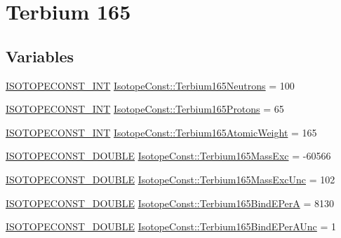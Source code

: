 \hypertarget{group___isotope_const-_terbium-_tb165}{}\section{Terbium 165}
\label{group___isotope_const-_terbium-_tb165}
\subsection*{Variables}
\begin{DoxyCompactItemize}
\item 
\mbox{\hyperlink{group___isotope_const-_macros_ga5f18360b3e99483a35c32d789e62621c}{I\+S\+O\+T\+O\+P\+E\+C\+O\+N\+S\+T\+\_\+\+I\+NT}} \mbox{\hyperlink{group___isotope_const-_terbium-_tb165_ga332ccf1f9dfd3dc833abade481da94e7}{Isotope\+Const\+::\+Terbium165\+Neutrons}} = 100
\item 
\mbox{\hyperlink{group___isotope_const-_macros_ga5f18360b3e99483a35c32d789e62621c}{I\+S\+O\+T\+O\+P\+E\+C\+O\+N\+S\+T\+\_\+\+I\+NT}} \mbox{\hyperlink{group___isotope_const-_terbium-_tb165_gad17fc1058df0655abb92aec31d097577}{Isotope\+Const\+::\+Terbium165\+Protons}} = 65
\item 
\mbox{\hyperlink{group___isotope_const-_macros_ga5f18360b3e99483a35c32d789e62621c}{I\+S\+O\+T\+O\+P\+E\+C\+O\+N\+S\+T\+\_\+\+I\+NT}} \mbox{\hyperlink{group___isotope_const-_terbium-_tb165_ga98fcf1ffa651efe6cbe15ef6371fa793}{Isotope\+Const\+::\+Terbium165\+Atomic\+Weight}} = 165
\item 
\mbox{\hyperlink{group___isotope_const-_macros_ga8f45a7272ce02c0b4c65c44636ed719a}{I\+S\+O\+T\+O\+P\+E\+C\+O\+N\+S\+T\+\_\+\+D\+O\+U\+B\+LE}} \mbox{\hyperlink{group___isotope_const-_terbium-_tb165_ga90e199f889f633f483003c903ec9c0f2}{Isotope\+Const\+::\+Terbium165\+Mass\+Exc}} = -\/60566
\item 
\mbox{\hyperlink{group___isotope_const-_macros_ga8f45a7272ce02c0b4c65c44636ed719a}{I\+S\+O\+T\+O\+P\+E\+C\+O\+N\+S\+T\+\_\+\+D\+O\+U\+B\+LE}} \mbox{\hyperlink{group___isotope_const-_terbium-_tb165_ga2165df688919a359ef7158e37dd0161b}{Isotope\+Const\+::\+Terbium165\+Mass\+Exc\+Unc}} = 102
\item 
\mbox{\hyperlink{group___isotope_const-_macros_ga8f45a7272ce02c0b4c65c44636ed719a}{I\+S\+O\+T\+O\+P\+E\+C\+O\+N\+S\+T\+\_\+\+D\+O\+U\+B\+LE}} \mbox{\hyperlink{group___isotope_const-_terbium-_tb165_gad69f355caacd7f9ff21160fcd0d41f18}{Isotope\+Const\+::\+Terbium165\+Bind\+E\+PerA}} = 8130
\item 
\mbox{\hyperlink{group___isotope_const-_macros_ga8f45a7272ce02c0b4c65c44636ed719a}{I\+S\+O\+T\+O\+P\+E\+C\+O\+N\+S\+T\+\_\+\+D\+O\+U\+B\+LE}} \mbox{\hyperlink{group___isotope_const-_terbium-_tb165_ga033f9ad68747861472de50ee576d3497}{Isotope\+Const\+::\+Terbium165\+Bind\+E\+Per\+A\+Unc}} = 1

\end{DoxyCompactItemize}
